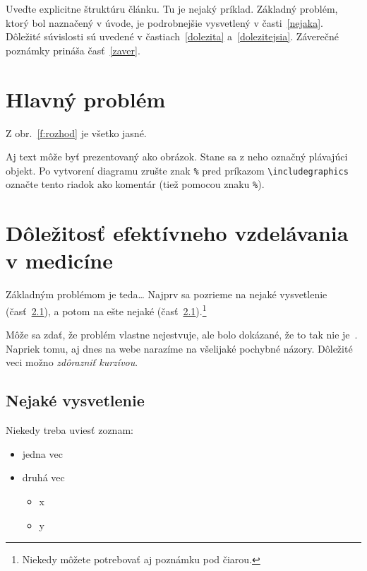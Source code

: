 \documentclass[10pt,twoside,slovak,a4paper]{article}
\begin{document}
Uveďte explicitne štruktúru článku. Tu je nejaký príklad.
Základný problém, ktorý bol naznačený v úvode, je podrobnejšie vysvetlený v časti~\ref{nejaka}.
Dôležité súvislosti sú uvedené v častiach~\ref{dolezita} a~\ref{dolezitejsia}.
Záverečné poznámky prináša časť~\ref{zaver}.



\section{Hlavný problém} \label{prvacast}

Z obr.~\ref{f:rozhod} je všetko jasné. 

\begin{figure*}[tbh]
\centering
Aj text môže byť prezentovaný ako obrázok. Stane sa z neho označný plávajúci objekt. Po vytvorení diagramu zrušte znak \texttt{\%} pred príkazom \verb|\includegraphics| označte tento riadok ako komentár (tiež pomocou znaku \texttt{\%}).
\caption{Rozhodujúci argument.}
\label{f:rozhod}
\end{figure*}



\section{Dôležitosť efektívneho vzdelávania v medicíne} \label{druhacast}

Základným problémom je teda\ldots{} Najprv sa pozrieme na nejaké vysvetlenie (časť~\ref{ina:nejake}), a potom na ešte nejaké (časť~\ref{ina:nejake}).\footnote{Niekedy môžete potrebovať aj poznámku pod čiarou.}

Môže sa zdať, že problém vlastne nejestvuje\cite{Coplien:MPD}, ale bolo dokázané, že to tak nie je~\cite{Czarnecki:Staged, Czarnecki:Progress}. Napriek tomu, aj dnes na webe narazíme na všelijaké pochybné názory\cite{PLP-Framework}. Dôležité veci možno \emph{zdôrazniť kurzívou}.


\subsection{Nejaké vysvetlenie} \label{ina:nejake}

Niekedy treba uviesť zoznam:

\begin{itemize}
\item jedna vec
\item druhá vec
	\begin{itemize}
	\item x
	\item y
	\end{itemize}
\end{itemize}
\end{document}
